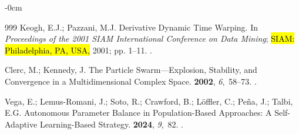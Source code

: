 \documentclass[mathematics,article,accept,moreauthors]{Definitions/mdpi}
\begin{document}
\begin{adjustwidth}{-\extralength}{0cm}
\begin{thebibliography}{999}
Keogh, E.J.; Pazzani, M.J.
\newblock Derivative Dynamic Time Warping.
\newblock In \textit{Proceedings of the  2001 SIAM International
  Conference on Data Mining}; 
  \hl{SIAM: Philadelphia, PA, USA,} 2001; pp. 1--11.
.

Clerc, M.; Kennedy, J.
\newblock The Particle Swarm---Explosion, Stability, and Convergence in a
  Multidimensional Complex Space.
 {\bf 2002}, {\em
  6},~58--73.
.

Vega, E.; Lemus-Romani, J.; Soto, R.; Crawford, B.; L{\"o}ffler, C.; Pe{\~n}a,
  J.; Talbi, E.G.
\newblock Autonomous Parameter Balance in Population-Based Approaches: A
  Self-Adaptive Learning-Based Strategy.
 {\bf 2024}, {\em 9},~82.
.

\end{thebibliography}





%


\PublishersNote{}
\end{adjustwidth}
\end{document}
